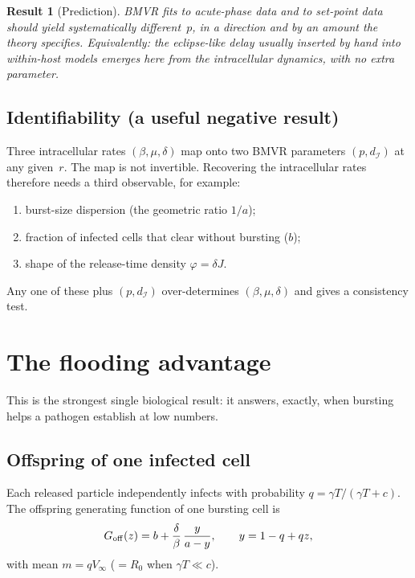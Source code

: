 \documentclass[11pt,a4paper]{article}
\newcommand{\Icell}{\mathcal{I}}
\theoremstyle{plain}
\newtheorem{result}{Result}[section]
\theoremstyle{definition}
\theoremstyle{remark}
\begin{document}
\begin{result}[Prediction]
BMVR fits to acute-phase data and to set-point data should yield systematically
different~$p$, in a direction and by an amount the theory specifies.
Equivalently: the eclipse-like delay usually inserted by hand into within-host
models emerges here from the intracellular dynamics, with no extra parameter.
\end{result}

\subsection{Identifiability (a useful negative result)}

Three intracellular rates $(\beta,\mu,\delta)$ map onto two BMVR parameters
$(p,d_{\Icell})$ at any given~$r$. The map is not invertible. Recovering the
intracellular rates therefore needs a third observable, for example:
\begin{enumerate}
\item burst-size dispersion (the geometric ratio $1/a$);
\item fraction of infected cells that clear without bursting ($b$);
\item shape of the release-time density $\varphi=\delta J$.
\end{enumerate}
Any one of these plus $(p,d_{\Icell})$ over-determines $(\beta,\mu,\delta)$ and
gives a consistency test.

\section{The flooding advantage}

This is the strongest single biological result: it answers, exactly, when
bursting helps a pathogen establish at low numbers.

\subsection{Offspring of one infected cell}

Each released particle independently infects with probability
$q=\gamma T/(\gamma T+c)$. The offspring generating function of one bursting
cell is
\begin{equation}
G_{\rm off}(z)=b+\frac{\delta}{\beta}\,\frac{y}{a-y},
\qquad y=1-q+qz,
\end{equation}
with mean $m=qV_\infty$ ($=R_0$ when $\gamma T\ll c$).
\end{document}

